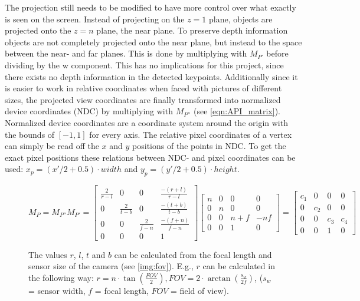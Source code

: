 \documentclass[conference]{IEEEtran}
\begin{document}
The projection still needs to be modified to have more control over what exactly is seen on the screen. Instead of projecting on the $z=1$ plane, objects are projected onto the $z=n$ plane, the near plane. To preserve depth information objects are not completely projected onto the near plane, but instead to the space between the near- and far planes. This is done by multiplying with $M_{P'}$ before dividing by the w component. This has no implications for this project, since there exists no depth information in the detected keypoints. Additionally since it is easier to work in relative coordinates when faced with pictures of different sizes, the projected view coordinates are finally transformed into normalized device coordinates (NDC) by multiplying with $M_{P''}$ (see \ref{eqn:API_matrix}). Normalized device coordinates are a coordinate system around the origin with the bounds of $\left[-1, 1\right]$ for every axis. The relative pixel coordinates of a vertex can simply be read off the $x$ and $y$ positions of the points in NDC. To get the exact pixel positions these relations between NDC- and pixel coordinates can be used:  $x_p = ({x'}/{2} + 0.5) \cdot width$ and $y_p = ({y'}/{2} + 0.5) \cdot height$.

\begin{figure}[h]
    \begin{equation} \label{eqn:API_matrix}
        M_{P} = M_{P''} M_{P'} =
        \begin{bmatrix}
            \frac{2}{r - l} & 0               & 0               & \frac{-(r + l)}{r - l} \\
            0               & \frac{2}{t - b} & 0               & \frac{-(t + b)}{t - b} \\
            0               & 0               & \frac{2}{f - n} & \frac{-(f + n)}{f - n} \\
            0               & 0               & 0               & 1
        \end{bmatrix}
        \begin{bmatrix}
            n & 0 & 0     & 0   \\
            0 & n & 0     & 0   \\
            0 & 0 & n + f & -nf \\
            0 & 0 & 1     & 0
        \end{bmatrix}
        =
        \begin{bmatrix}
            c_1 & 0   & 0   & 0   \\
            0   & c_2 & 0   & 0   \\
            0   & 0   & c_3 & c_4 \\
            0   & 0   & 1   & 0
        \end{bmatrix}
    \end{equation}
    \caption[]{The values $r$, $l$, $t$ and $b$ can be calculated from the focal length and sensor size of the camera (see \ref{img:fov}). E.g., $r$ can be calculated in the following way:
        $r = n \cdot \tan\left(\frac{FOV}{2}\right),
            FOV = 2 \cdot \arctan\left(\frac{s_w}{2f}\right)$,
        ($s_w$ = sensor width, $f$ = focal length, $FOV$ = field of view).
    }
\end{figure}
\end{document}
